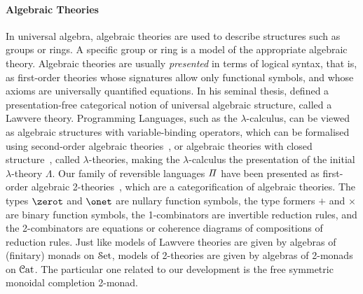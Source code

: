 \paragraph{Algebraic Theories} In universal algebra, algebraic theories are used to describe structures such as groups
or rings. A specific group or ring is a model of the appropriate algebraic theory. Algebraic theories are usually
\emph{presented} in terms of logical syntax, that is, as first-order theories whose signatures allow only functional
symbols, and whose axioms are universally quantified equations. In his seminal thesis,
\citet{lawvereFUNCTORIALSEMANTICSALGEBRAIC1963} defined a presentation-free categorical notion of universal algebraic
structure, called a Lawvere theory. Programming Languages, such as the $\lambda$-calculus, can be viewed as algebraic
structures with variable-binding operators, which can be formalised using second-order algebraic
theories~\cite{fioreSecondOrderAlgebraicTheories2010}, or algebraic theories with closed
structure~\cite{hylandClassicalLambdaCalculus2017}, called $\lambda$-theories, making the $\lambda$-calculus the
presentation of the initial $\lambda$-theory $\Lambda$. Our family of reversible languages $\mathit{\Pi}$ have been presented
as first-order algebraic
2-theories~\cite{cohenCoherenceRewriting2theories2009,bekeCategorificationTermRewriting2011,yanofskySyntaxCoherence2000},
which are a categorification of algebraic theories. The types $\zerot$ and $\onet$ are nullary function symbols, the
type formers $+$ and $\times$ are binary function symbols, the 1-combinators are invertible reduction rules, and the
2-combinators are equations or coherence diagrams of compositions of reduction rules. Just like models of Lawvere
theories are given by algebras of (finitary) monads on $\SetCat$, models of 2-theories are given by algebras of 2-monads
on $\CatCat$. The particular one related to our development is the free symmetric monoidal completion 2-monad.

